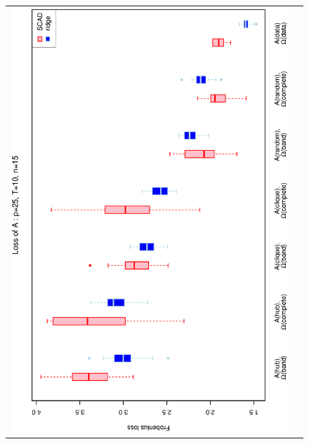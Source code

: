 \documentclass[a4paper]{article}
\begin{document}
\begin{figure}[h!]
\centering
\begin{tabular}{cc}
\includegraphics[scale=0.45,angle=270]{LossA25T10N15_25.eps}
\\

\end{tabular}
\end{figure}
\end{document}
